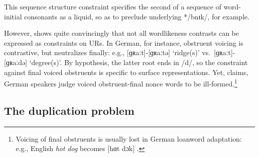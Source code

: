 \noindent
This sequence structure constraint specifies the second of a sequence of word-initial consonants as a liquid, so as to preclude underlying */bnɪk/, for example.

However, \citet{Shibatani1973} shows quite convincingly that not all wordlikeness contrasts can be expressed as constraints on URs.
In German, for instance, obstruent voicing is contrastive, but neutralizes finally: e.g., [ɡʀaːt]-[ɡʀaːtə] `ridge(s)' vs.~[ɡʀaːt]-[ɡʀaːdə] `degree(s)'.
By hypothesis, the latter root ends in /d/, so the constraint against final voiced obstruents is specific to surface representations.
Yet, \citeauthor{Shibatani1973} claims, German speakers judge voiced obstruent-final nonce words to be ill-formed.\footnote{
    Voicing of final obstruents is usually lost in German loanword adaptation: e.g., English \emph{hot dog} becomes [hɑt dɔk] \citep[506]{Ussishkin2003}.}

\subsection{The duplication problem}
\label{ss:dp}

